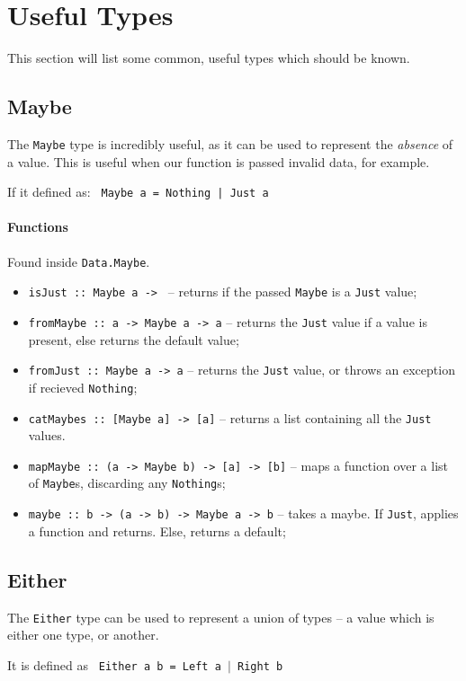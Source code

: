 \section{Useful Types}
This section will list some common, useful types which should be known.

\subsection{Maybe}
The \texttt{Maybe} type is incredibly useful, as it can be used to represent the \textit{absence} of a value. This is useful when our function is passed invalid data, for example.

If it defined as: \texttt{ Maybe a = Nothing | Just a}

\paragraph{Functions}
Found inside \texttt{Data.Maybe}.
\begin{itemize}
  \item \texttt{isJust :: Maybe a -> } -- returns if the passed \texttt{Maybe} is a \texttt{Just} value;
  \item \texttt{fromMaybe :: a -> Maybe a -> a} -- returns the \texttt{Just} value if a value is present, else returns the default value;
  \item \texttt{fromJust :: Maybe a -> a} -- returns the \texttt{Just} value, or throws an exception if recieved \texttt{Nothing};
  \item \texttt{catMaybes :: [Maybe a] -> [a]} -- returns a list containing all the \texttt{Just} values.
  \item \texttt{mapMaybe :: (a -> Maybe b) -> [a] -> [b]} -- maps a function over a list of \texttt{Maybe}s, discarding any \texttt{Nothing}s;
  \item \texttt{maybe :: b -> (a -> b) -> Maybe a -> b} -- takes a maybe. If \texttt{Just}, applies a function and returns. Else, returns a default;
\end{itemize}

\subsection{Either}
The \texttt{Either} type can be used to represent a union of types -- a value which is either one type, or another.

It is defined as \texttt{ Either a b = Left a $\mid$ Right b}

